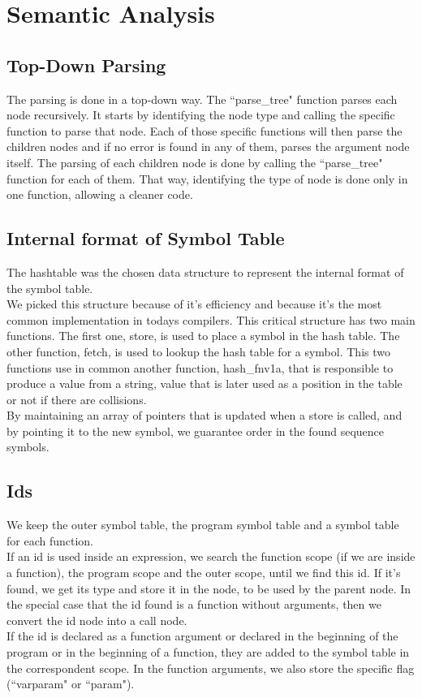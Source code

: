 \documentclass[12pt]{article}
\begin{document}
\newpage

\section{Semantic Analysis}

\subsection{Top-Down Parsing}

The parsing is done in a top-down way. The ``parse\_tree" function parses each node recursively. It starts by identifying the node type and calling the specific function to parse that node. Each of those specific functions will then parse the children nodes and if no error is found in any of them, parses the argument node itself. The parsing of each children node is done by calling the ``parse\_tree" function for each of them. That way, identifying the type of node is done only in one function, allowing a cleaner code.\\

\subsection{Internal format of Symbol Table}

The hashtable was the chosen data structure to represent the internal format of the symbol table. \\
We picked this structure because of it's efficiency and because it's the most common implementation in todays compilers. This critical structure has two main functions. The first one, store, is used to place a symbol in the hash table. The other function, fetch, is used to lookup the hash table for a symbol. This two functions use in common another function, hash\_fnv1a, that is responsible to produce a value from a string, value that is later used as a position in the table or not if there are collisions. \\
By maintaining an array of pointers that is updated when a store is called, and by pointing it to the new symbol, we guarantee order in the found sequence symbols. \\

\subsection{Ids}

We keep the outer symbol table, the program symbol table and a symbol table for each function. \\
If an id is used inside an expression, we search the function scope (if we are inside a function), the program scope and the outer scope, until we find this id. If it's found, we get its type and store it in the node, to be used by the parent node. In the special case that the id found is a function without arguments, then we convert the id node into a call node. \\
If the id is declared as a function argument or declared in the beginning of the program or in the beginning of a function, they are added to the symbol table in the correspondent scope. In the function arguments, we also store the specific flag (``varparam" or ``param").
\end{document}
